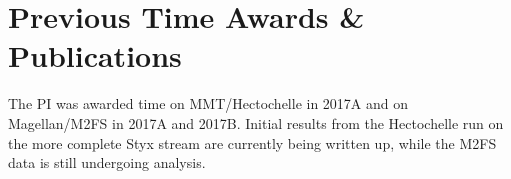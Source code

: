 \documentclass[12pt]{article}
\begin{document}
\section*{Previous Time Awards \& Publications}\vskip-0.2in

The PI was awarded time on MMT/Hectochelle in 2017A and on Magellan/M2FS in 2017A and 2017B.
Initial results from the Hectochelle run on the more complete Styx stream are currently being written up, while the M2FS data is still undergoing analysis.



%
%
%
%
%
\end{document}
